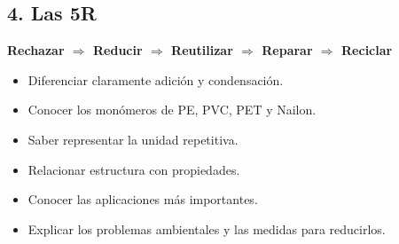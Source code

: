
\subsection*{4. Las 5R}

\begin{center}

\Large

\textbf{
Rechazar
$\Longrightarrow$
Reducir
$\Longrightarrow$
Reutilizar
$\Longrightarrow$
Reparar
$\Longrightarrow$
Reciclar
}

\end{center}


\begin{tcolorbox}[
title=Lo imprescindible para la EBAU,
colback=red!5,
colframe=red!70!black]

\begin{itemize}

\item Diferenciar claramente adición y condensación.

\item Conocer los monómeros de PE, PVC, PET y Nailon.

\item Saber representar la unidad repetitiva.

\item Relacionar estructura con propiedades.

\item Conocer las aplicaciones más importantes.

\item Explicar los problemas ambientales y las medidas para reducirlos.

\end{itemize}

\end{tcolorbox}